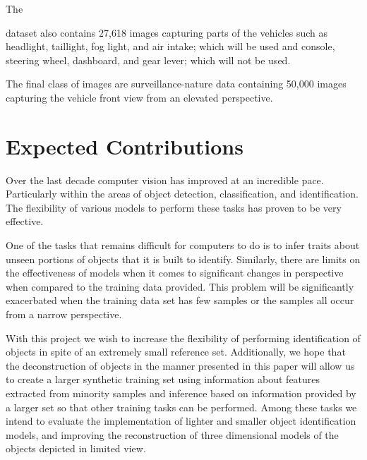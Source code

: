 \documentclass[sigplan,nonacm]{acmart}
\begin{document}
The 

\cite{}

dataset also contains 27,618 images capturing parts
of the vehicles such as headlight, taillight, fog light, and air intake; which will be used and
console, steering wheel, dashboard, and gear lever; which will not be used.

The final class of images are surveillance-nature data containing 50,000 images capturing
the vehicle front view from an elevated perspective.

\section{Expected Contributions}

Over the last decade computer vision has improved at an incredible pace.
Particularly within the areas of object detection, classification, and identification.
The flexibility of various models to perform these tasks has proven to be very effective.

One of the tasks that remains difficult for computers to do is to infer traits about unseen portions
of objects that it is built to identify.
Similarly, there are limits on the effectiveness of models when it comes to significant
changes in perspective when compared to the training data provided.
This problem will be significantly exacerbated when the training data set has few samples
or the samples all occur from a narrow perspective.

With this project we wish to increase the flexibility of performing identification of objects in spite
of an extremely small reference set.
Additionally, we hope that the deconstruction of objects in the manner presented in this paper will allow
us to create a larger synthetic training set using information about features extracted from minority
samples and inference based on information provided by a larger set so that other training tasks can be performed.
Among these tasks we intend to evaluate the implementation of lighter and smaller object identification models, 
and improving the reconstruction of three dimensional models of the objects depicted in limited view. 

\end{document}
